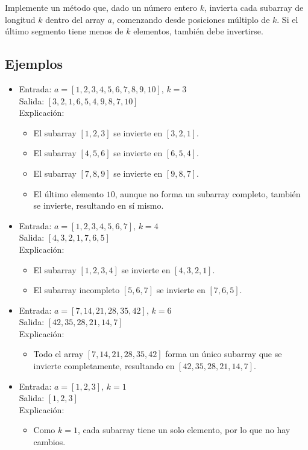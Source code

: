 Implemente un método que, dado un número entero \(k\), invierta cada subarray de longitud \(k\) dentro del array \(a\), comenzando desde posiciones múltiplo de \(k\). Si el último segmento tiene menos de \(k\) elementos, también debe invertirse.

\subsection*{Ejemplos}

\begin{itemize}
    \item Entrada: \(a = [1, 2, 3, 4, 5, 6, 7, 8, 9, 10], \, k = 3\)\\
    Salida: \([3, 2, 1, 6, 5, 4, 9, 8, 7, 10]\)\\
    Explicación: 
    \begin{itemize}
        \item El subarray \([1, 2, 3]\) se invierte en \([3, 2, 1]\).
        \item El subarray \([4, 5, 6]\) se invierte en \([6, 5, 4]\).
        \item El subarray \([7, 8, 9]\) se invierte en \([9, 8, 7]\).
        \item El último elemento \(10\), aunque no forma un subarray completo, también se invierte, resultando en sí mismo.
    \end{itemize}

    \item Entrada: \(a = [1, 2, 3, 4, 5, 6, 7], \, k = 4\)\\
    Salida: \([4, 3, 2, 1, 7, 6, 5]\)\\
    Explicación:
    \begin{itemize}
        \item El subarray \([1, 2, 3, 4]\) se invierte en \([4, 3, 2, 1]\).
        \item El subarray incompleto \([5, 6, 7]\) se invierte en \([7, 6, 5]\).
    \end{itemize}

    \item Entrada: \(a = [7, 14, 21, 28, 35, 42], \, k = 6\)\\
    Salida: \([42, 35, 28, 21, 14, 7]\)\\
    Explicación:
    \begin{itemize}
        \item Todo el array \([7, 14, 21, 28, 35, 42]\) forma un único subarray que se invierte completamente, resultando en \([42, 35, 28, 21, 14, 7]\).
    \end{itemize}

    \item Entrada: \(a = [1, 2, 3], \, k = 1\)\\
    Salida: \([1, 2, 3]\)\\
    Explicación:
    \begin{itemize}
        \item Como \(k = 1\), cada subarray tiene un solo elemento, por lo que no hay cambios.
    \end{itemize}
\end{itemize}
